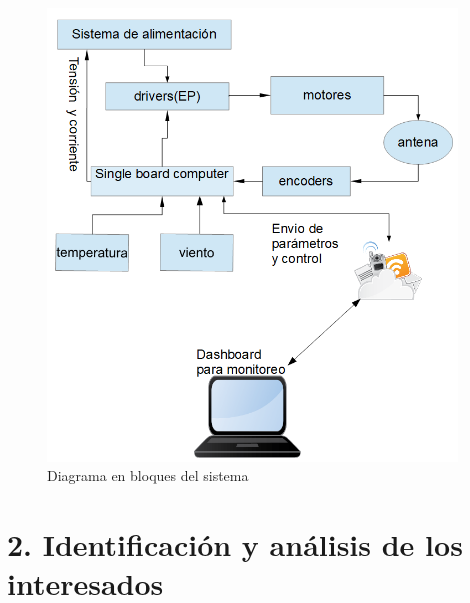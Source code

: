 \documentclass[11pt, %
codirector, %
]{charter}
\begin{document}
\begin{figure}[h!]
	\vspace{-0.1cm}
	\centering 
	\includegraphics[height=12cm,width =\textwidth]{Figuras/seccion_1/interferometria.png}
	\caption{Diagrama en bloques del sistema }
	\label{fig:bloques_sistema}
\end{figure} 



\section{2. Identificación y análisis de los interesados}
\label{sec:interesados}
\end{document}
